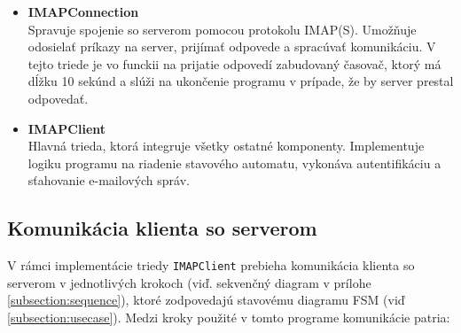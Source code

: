 \documentclass[a4paper, 11pt]{article}
\begin{document}
\begin{itemize}
		\item \textbf{IMAPConnection} \\
		Spravuje spojenie so serverom pomocou protokolu IMAP(S). Umožňuje odosielať príkazy na server, prijímať odpovede a spracúvať komunikáciu\cite{opennsslapi}. V tejto triede je vo funckii na prijatie odpovedí zabudovaný časovač, ktorý má dĺžku 10 sekúnd a slúži na ukončenie programu v prípade, že by server prestal odpovedať.
	
		\item \textbf{IMAPClient} \\
		Hlavná trieda, ktorá integruje všetky ostatné komponenty. Implementuje logiku programu na riadenie stavového automatu, vykonáva autentifikáciu a sťahovanie e-mailových správ.
	\end{itemize}	

	\subsection{Komunikácia klienta so serverom}
	V rámci implementácie triedy \texttt{IMAPClient} prebieha komunikácia klienta so serverom v jednotlivých krokoch (viď. sekvenčný diagram v prílohe \ref{subsection:sequence}), ktoré zodpovedajú stavovému diagramu FSM (viď \ref{subsection:usecase}). Medzi kroky použité v tomto programe komunikácie patria:
\end{document}

